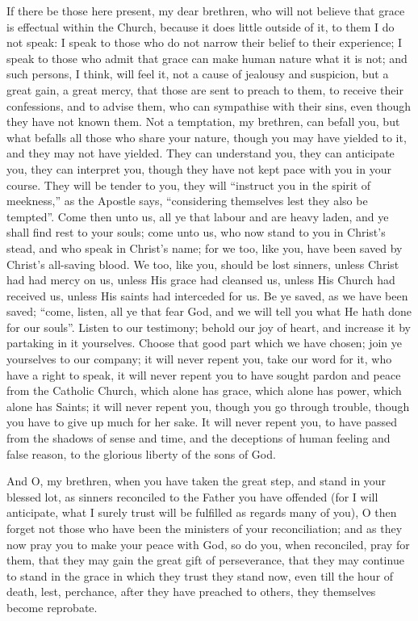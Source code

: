 If there be those here present, my dear brethren, who will not
believe that grace is effectual within the Church, because it does
little outside of it, to them I do not speak: I speak to those who do
not narrow their belief to their experience; I speak to those who
admit that grace can make human nature what it is not; and such
persons, I think, will feel it, not a cause of jealousy and suspicion,
but a great gain, a great mercy, that those are sent to preach to
them, to receive their confessions, and to advise them, who can
sympathise with their sins, even though they have not known them. Not
a temptation, my brethren, can befall you, but what befalls all those
who share your nature, though you may have yielded to it, and they may
not have yielded. They can understand you, they can anticipate you,
they can interpret you, though they have not kept pace with you in
your course. They will be tender to you, they will ``instruct you
in the spirit of meekness,'' as the Apostle says,
``considering themselves lest they also be tempted''. Come
then unto us, all ye that labour and are heavy laden, and ye shall
find rest to your souls; come unto us, who now stand to you in
Christ's stead, and who speak in Christ's name; for we too, like you,
have been saved by Christ's all-saving blood. We too, like you, should
be lost sinners, unless Christ had had mercy on us, unless His grace
had cleansed us, unless His Church had received us, unless His saints
had interceded for us. Be ye saved, as we have been saved; ``come,
listen, all ye that fear God, and we will tell you what He hath done
for our souls''. Listen to our testimony; behold our joy of heart,
and increase it by partaking in it yourselves. Choose that good part
which we have chosen; join ye yourselves to our company; it will never
repent you, take our word for it, who have a right to speak, it will
never repent you to have sought pardon and peace from the Catholic
Church, which alone has grace, which alone has power, which alone has
Saints; it will never repent you, though you go through trouble,
though you have to give up much for her sake. It will never repent
you, to have passed from the shadows of sense and time, and the
deceptions of human feeling and false reason, to the glorious liberty
of the sons of God.

And O, my brethren, when you have taken the great step, and stand
in your blessed lot, as sinners reconciled to the Father you have
offended (for I will anticipate, what I surely trust will be fulfilled
as regards many of you), O then forget not those who have been the
ministers of your reconciliation; and as they now pray you to make
your peace with God, so do you, when reconciled, pray for them, that
they may gain the great gift of perseverance, that they may continue
to stand in the grace in which they trust they stand now, even till
the hour of death, lest, perchance, after they have preached to
others, they themselves become reprobate.


